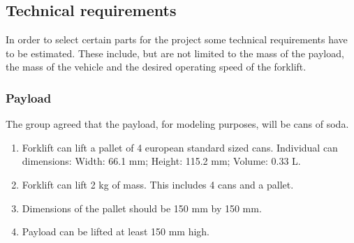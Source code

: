 \documentclass{article}
\begin{document}
    \subsection{Technical requirements}
        In order to select certain parts for the project some technical requirements 
        have to be estimated. These include, but are not limited to the mass of the 
        payload, the mass of the vehicle and the desired operating speed of the 
        forklift.

        \subsubsection{Payload} %
           The group agreed that the payload, for modeling purposes, will be cans of soda.
           \begin{center}
                \begin{enumerate}
                    \item Forklift can lift a pallet of 4 european standard sized cans. Individual can dimensions: Width: 66.1 mm; Height: 115.2 mm; Volume: 0.33 L. %
                    \item Forklift can lift  2 kg of mass. This includes 4 cans and a pallet. %
                    \item Dimensions of the pallet should be 150 mm by 150 mm. %
                    \item Payload can be lifted at least 150 mm high. %
                \end{enumerate}
            \end{center}
\end{document}
